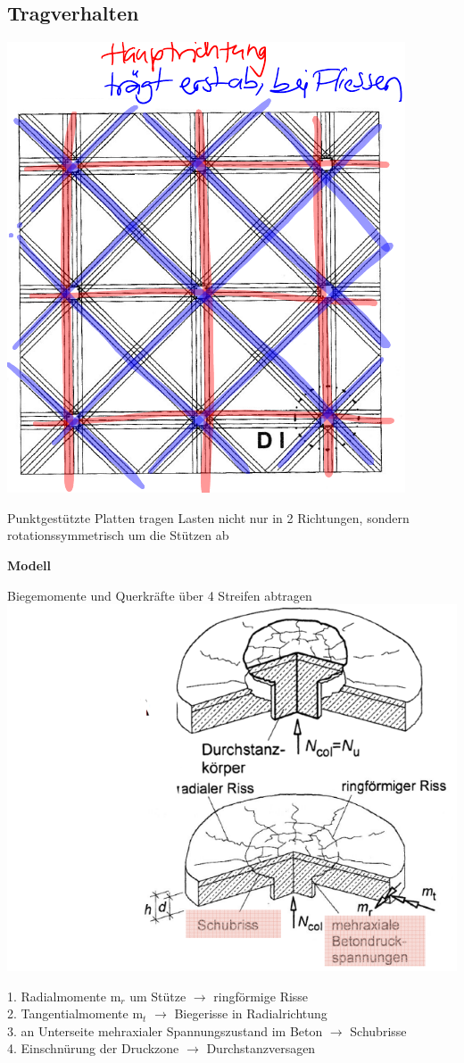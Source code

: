 	\begin{minipage}{0.5\linewidth}
		
		\subsection{Tragverhalten}
		
			\includegraphics[width=0.4\linewidth]{images/PilzFlach1Lastabtrag.PNG}
	
		Punktgestützte Platten tragen Lasten nicht nur in 2 Richtungen, sondern rotationssymmetrisch um die Stützen ab
		
		\textbf{Modell}
		
		Biegemomente und Querkräfte über 4 Streifen abtragen \\	
		
		
		
			\includegraphics[width=\linewidth]{images/PilzFlach2Schnittkrat.PNG}
	
		1. Radialmomente m$_r$ um Stütze $\rightarrow$ ringförmige Risse \\
		2. Tangentialmomente m$_t$ $\rightarrow$ Biegerisse in Radialrichtung \\
		3. an Unterseite mehraxialer Spannungszustand im Beton $\rightarrow$ Schubrisse \\
		4. Einschnürung der Druckzone $\rightarrow$ Durchstanzversagen
			
	\end{minipage}
